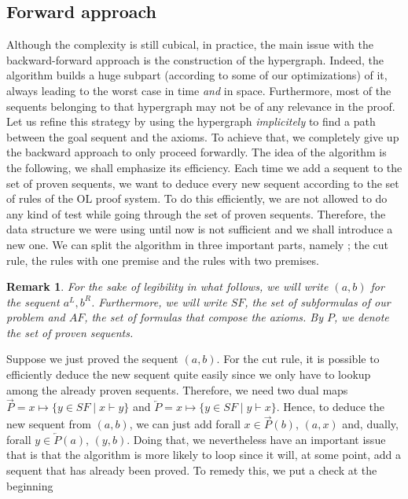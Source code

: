 \documentclass[a4paper, 11pt]{article}
\newtheorem*{remark}{Remark}
\begin{document}
    \subsection{Forward approach}
    Although the complexity is still cubical, in practice, the main issue with the backward-forward 
    approach is the construction of the hypergraph. Indeed,
    the algorithm builds a huge subpart (according to some of our optimizations) of it, always leading 
    to the worst case in time \textit{and} in space. Furthermore, most of the sequents belonging to 
    that hypergraph may not be of any relevance in the proof. Let us refine this strategy by using the
    hypergraph \textit{implicitely} to find a path between the goal sequent and the axioms. To achieve
    that, we completely give up the backward approach to only proceed forwardly. 
    The idea of the algorithm is the following, we shall emphasize its efficiency.
    Each time we add a sequent to the set of proven sequents, we want to deduce every new sequent
    according to the set of rules of the OL proof system.
    To do this efficiently, we are not allowed to do any kind of test while going through the set of
    proven sequents. Therefore, the data structure we were using until now is not sufficient
    and we shall introduce a new one. We can split the algorithm in three important parts, namely ;
    the cut rule, the rules with one premise and the rules with two premises. 
    \begin{remark}
	For the sake of legibility in what follows, we will write $(a,b)$ for the sequent $a^L,b^R$. 
	    Furthermore,
	    we will write $SF$, the set of subformulas of our problem and $AF$, the set of formulas
	    that compose the axioms. By $P$, we denote the set of proven sequents.
    \end{remark} 
    Suppose we just proved the sequent $(a,b)$. For the cut rule,
    it is possible to efficiently deduce the new sequent quite easily since we only have to
    lookup among the already proven sequents. Therefore, we need two dual maps 
    $\overrightarrow{P}=x\mapsto\{y\in SF\mid x\vdash y\}$ and
    $\overleftarrow{P}=x\mapsto\{y\in SF\mid y\vdash x\}$. Hence, to deduce
    the new sequent from $(a,b)$, we can just add forall $x\in\overrightarrow{P}(b)$, $(a,x)$ and,
    dually, forall $y\in\overleftarrow{P}(a)$, $(y,b)$. Doing that, we nevertheless have an important
    issue that is that the algorithm is more likely to loop since it will, at some point, add a sequent
    that has already been proved. To remedy this, we put a check at the beginning
\end{document}
